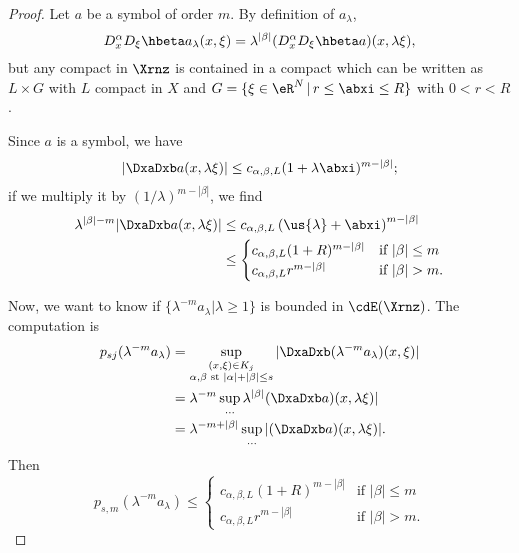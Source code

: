 \begin{proof}
Let $a$ be a symbol of order $m$. By definition of $a_{\lambda}$,
\[
  D_x^{\alpha} D_{\xi}\hbeta a_{\lambda}(x,\xi)=\lambda^{|\beta|}(D_x^{\alpha} D_{\xi}\hbeta a)(x,\lambda\xi),
\]
but any compact in $\Xrnz$ is contained in a compact which can be written as $L\times G$ with $L$ compact in $X$ and $G=\{\xi\in\eR^N\,|\, r\leq\abxi\leq R\}$ with $0<r<R$.

Since $a$ is a symbol, we have
\[
   |\DxaDxb a(x,\lambda\xi)|\leq  c_{\alpha,\beta,L}(1+\lambda\abxi)^{m-|\beta|};
\]
if we multiply it by $(1/\lambda)^{m-|\beta|}$, we find
\begin{equation}
\begin{split}
  \lambda^{|\beta|-m}|\DxaDxb a(x,\lambda\xi)|
     &\leq c_{\alpha,\beta,L}\left(\us{\lambda}+\abxi\right)^{m-|\beta|}\\
     &\leq \begin{cases}
                   c_{\alpha,\beta,L}(1+R)^{m-|\beta|} &\text{if $|\beta|\leq m$}\\
		   c_{\alpha,\beta,L}r^{m-|\beta|}     &\text{if $|\beta|> m$}.
           \end{cases}
\end{split}
\end{equation}

Now, we want to know if $\{ \lambda^{-m}a_{\lambda}|\lambda\geq 1 \}$ is bounded in $\cdE(\Xrnz)$. The computation is
\begin{equation}
\begin{split}
    p_{sj}(\lambda^{-m}a_{\lambda})&=\sup_{ \substack{(x,\xi)\in K_j\\ \alpha,\beta\text{ st } |\alpha|+|\beta|\leq s }}|\DxaDxb(\lambda^{-m}a_{\lambda})(x,\xi)|\\
                       &=\lambda^{-m}\sup_{\ldots}\lambda^{|\beta|}(\DxaDxb a)(x,\lambda\xi)|\\
		       &=\lambda^{-m+|\beta|}\sup_{\ldots}|(\DxaDxb a)(x,\lambda\xi)|.
\end{split}
\end{equation}
Then
\begin{equation}
p_{s,m}(\lambda^{-m} a_{\lambda})\leq \begin{cases}
                   c_{\alpha,\beta,L}(1+R)^{m-|\beta|} &\text{if $|\beta|\leq m$}\\
		   c_{\alpha,\beta,L}r^{m-|\beta|}     &\text{if $|\beta|> m$}.
           \end{cases}
\end{equation}


\end{proof}
